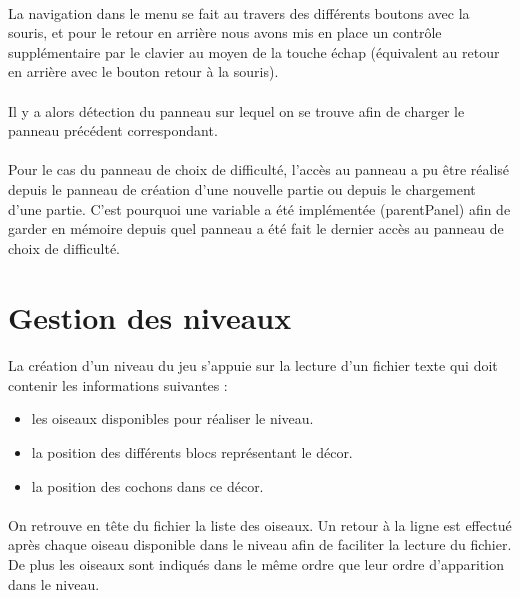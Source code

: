\documentclass[a4paper,12pt]{report}
\begin{document}
\paragraph{}La navigation dans le menu se fait au travers des différents boutons avec la souris, et pour le retour en arrière nous avons mis en place un contrôle supplémentaire par le clavier au moyen de la touche \guillemotleft échap \guillemotright(équivalent au retour en arrière avec le bouton \guillemotleft retour \guillemotright à la souris).
\paragraph{}Il y a alors détection du panneau sur lequel on se trouve afin de charger le panneau \guillemotleft précédent \guillemotright correspondant. 
\paragraph{}Pour le cas du panneau de choix de difficulté, l’accès au panneau a pu être réalisé depuis le panneau de création d’une nouvelle partie ou depuis le chargement d’une partie. C’est pourquoi une variable a été implémentée (parentPanel) afin de garder en mémoire depuis quel panneau a été fait le dernier accès au panneau de choix de difficulté.


\section{Gestion des niveaux}
\paragraph{}La création d’un niveau du jeu s’appuie sur la lecture d’un fichier texte qui doit contenir les informations suivantes :
\begin{itemize}
\item les oiseaux disponibles pour réaliser le niveau.
\item la position des différents blocs représentant le décor.
\item la position des cochons dans ce décor.
\end{itemize}

\paragraph{}On retrouve en tête du fichier la liste des oiseaux. Un retour à la ligne est effectué après chaque oiseau disponible dans le niveau afin de faciliter la lecture du fichier. De plus les oiseaux sont indiqués dans le même ordre que leur ordre d’apparition dans le niveau.
\end{document}
